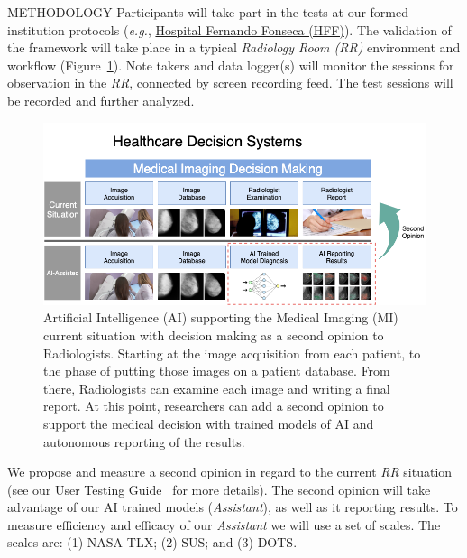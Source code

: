 \documentclass[final]{beamer}
\begin{document}
\begin{frame}[t, fragile = singleslide]{}
\begin{columns}[t]
\begin{column}{0.45\textwidth}
\begin{block}{METHODOLOGY}
Participants will take part in the tests at our formed institution protocols (\textit{e.g.}, \hyperlink{http://hff.min-saude.pt/}{Hospital Fernando Fonseca (HFF)}). The validation of the framework will take place in a typical \textit{Radiology Room (RR)} environment and workflow (Figure~\ref{fig:fig001}). Note takers and data logger(s) will monitor the sessions for observation in the \textit{RR}, connected by screen recording feed. The test sessions will be recorded and further analyzed.

\begin{figure}[!htb]
\centering
\caption{Artificial Intelligence (AI) supporting the Medical Imaging (MI) current situation with decision making as a second opinion to Radiologists. Starting at the image acquisition from each patient, to the phase of putting those images on a patient database. From there, Radiologists can examine each image and writing a final report. At this point, researchers can add a second opinion to support the medical decision with trained models of AI and autonomous reporting of the results.}
\label{fig:fig001}
\includegraphics[width = \columnwidth]{./figures/fig001}
\end{figure}

We propose and measure a second opinion in regard to the current \textit{RR} situation (see our User Testing Guide~\cite{https://doi.org/10.13140/rg.2.2.16566.14403/1} for more details). The second opinion will take advantage of our AI trained models (\textit{Assistant}), as well as it reporting results. To measure efficiency and efficacy of our \textit{Assistant} we will use a set of scales. The scales are: (1) NASA-TLX; (2) SUS; and (3) DOTS.

\end{block}

\end{column}


\end{columns}
\end{frame}
\end{document}
